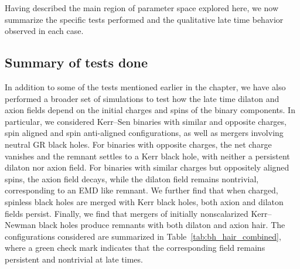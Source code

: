 Having described the main region of parameter space explored here, we now summarize the specific tests performed and the qualitative late time behavior observed in each case.

\subsection{Summary of tests done}
\label{sec:appx:sim_tab}
In addition to some of the tests mentioned earlier in the chapter, we have also performed a broader set of simulations to test how the late time dilaton and axion fields depend on the initial charges and spins of the binary components. In particular, we considered Kerr--Sen binaries with similar and opposite charges, spin aligned and spin anti-aligned configurations, as well as mergers involving neutral GR black holes. For binaries with opposite charges, the net charge vanishes and the remnant settles to a Kerr black hole, with neither a persistent dilaton nor axion field. For binaries with similar charges but oppositely aligned spins, the axion field decays, while the dilaton field remains nontrivial, corresponding to an EMD like remnant. We further find that when charged, spinless black holes are merged with Kerr black holes, both axion and dilaton fields persist. Finally, we find that mergers of initially nonscalarized Kerr--Newman black holes produce remnants with both dilaton and axion hair. The configurations considered are summarized in Table~\ref{tab:bh_hair_combined}, where a green check mark indicates that the corresponding field remains persistent and nontrivial at late times.

